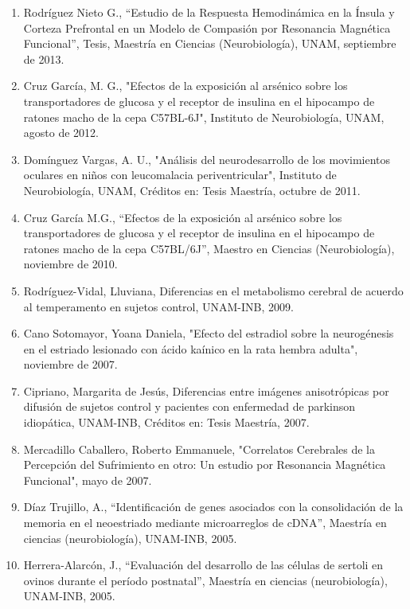 \begin{enumerate}
\item  Rodríguez Nieto G., “Estudio de la Respuesta Hemodinámica en la Ínsula y Corteza Prefrontal en un Modelo de Compasión 
por 
Resonancia Magnética Funcional”, Tesis, Maestría en Ciencias (Neurobiología), UNAM, septiembre de 
2013.

\item  Cruz García, M. G., "Efectos de la exposición al arsénico sobre los transportadores de glucosa y el receptor de insulina 
en 
el hipocampo de ratones macho de la cepa C57BL-6J", Instituto de Neurobiología, UNAM, agosto de 
2012.

\item  Domínguez Vargas, A. U., "Análisis del neurodesarrollo de los movimientos oculares en niños con leucomalacia 
periventricular", Instituto de Neurobiología, UNAM, Créditos en: Tesis Maestría, octubre de 2011.

\item  Cruz García M.G., “Efectos de la exposición al arsénico sobre los transportadores de glucosa y el receptor de insulina 
en 
el hipocampo de ratones macho de la cepa C57BL/6J”, Maestro en Ciencias (Neurobiología), noviembre 
de 2010.

\item  Rodríguez-Vidal, Lluviana, Diferencias en el metabolismo cerebral de acuerdo al temperamento en sujetos control, 
UNAM-INB, 
 2009.

\item  Cano Sotomayor, Yoana Daniela, "Efecto del estradiol sobre la neurogénesis en el estriado lesionado con ácido kaínico en 
la 
rata hembra adulta", noviembre de 2007.

\item  Cipriano, Margarita de Jesús, Diferencias entre imágenes anisotrópicas por difusión de sujetos control y pacientes con 
enfermedad de parkinson idiopática, UNAM-INB, Créditos en: Tesis Maestría, 2007.

\item  Mercadillo Caballero, Roberto Emmanuele, "Correlatos Cerebrales de la Percepción del Sufrimiento en otro: Un estudio por 
Resonancia Magnética Funcional", mayo de 2007.

\item  Díaz Trujillo, A., “Identificación de genes asociados con la consolidación de la memoria en el neoestriado mediante 
microarreglos de cDNA”, Maestría en ciencias (neurobiología), UNAM-INB, 2005.

\item  Herrera-Alarcón, J., “Evaluación del desarrollo de las células de sertoli en ovinos durante el período postnatal”, 
Maestría 
en ciencias (neurobiología), UNAM-INB, 2005.


\end{enumerate}

